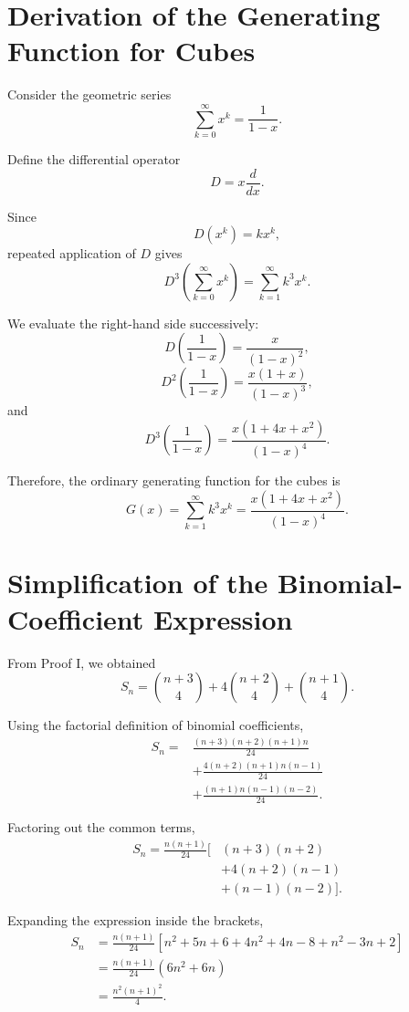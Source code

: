 \documentclass[11pt,a4paper]{article}
\begin{document}

\appendix

\section{Derivation of the Generating Function for Cubes}
\label{appendix:generating-functions}

Consider the geometric series
\[
\sum_{k=0}^{\infty}x^k=\frac{1}{1-x}.
\]

Define the differential operator
\[
D=x\frac{d}{dx}.
\]

Since
\[
D(x^k)=kx^k,
\]
repeated application of $D$ gives
\[
D^3\left(\sum_{k=0}^{\infty}x^k\right)
=
\sum_{k=1}^{\infty}k^3x^k.
\]

We evaluate the right-hand side successively:
\[
D\left(\frac{1}{1-x}\right)
=
\frac{x}{(1-x)^2},
\]
\[
D^2\left(\frac{1}{1-x}\right)
=
\frac{x(1+x)}{(1-x)^3},
\]
and
\[
D^3\left(\frac{1}{1-x}\right)
=
\frac{x(1+4x+x^2)}{(1-x)^4}.
\]

Therefore, the ordinary generating function for the cubes is
\[
\boxed{
G(x)=\sum_{k=1}^{\infty}k^3x^k
=\frac{x(1+4x+x^2)}{(1-x)^4}
}.
\]

\section{Simplification of the Binomial-Coefficient Expression}
\label{appendix:binomial-simplification}

From Proof I, we obtained
\[
S_n=
\binom{n+3}{4}
+4\binom{n+2}{4}
+\binom{n+1}{4}.
\]

Using the factorial definition of binomial coefficients,
\[
\begin{aligned}
S_n
={}&\frac{(n+3)(n+2)(n+1)n}{24}\\
&+\frac{4(n+2)(n+1)n(n-1)}{24}\\
&+\frac{(n+1)n(n-1)(n-2)}{24}.
\end{aligned}
\]

Factoring out the common terms,
\[
\begin{aligned}
S_n
=\frac{n(n+1)}{24}\big[
&(n+3)(n+2)\\
&+4(n+2)(n-1)\\
&+(n-1)(n-2)
\big].
\end{aligned}
\]

Expanding the expression inside the brackets,
\[
\begin{aligned}
S_n
&=\frac{n(n+1)}{24}
\left[
n^2+5n+6
+4n^2+4n-8
+n^2-3n+2
\right]\\
&=\frac{n(n+1)}{24}(6n^2+6n)\\
&=\frac{n^2(n+1)^2}{4}.
\end{aligned}
\]
\end{document}
